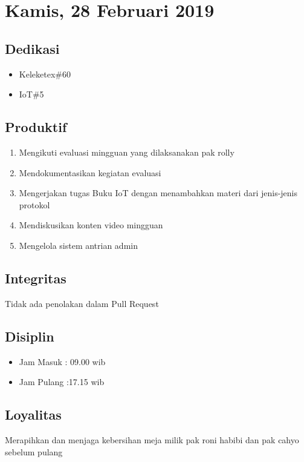 \section{Kamis, 28 Februari 2019}
\subsection{Dedikasi}
\begin{itemize}
\item Keleketex\#60
\item IoT\#5
\end{itemize}
\subsection{Produktif}
\begin{enumerate}
\item Mengikuti evaluasi mingguan yang dilaksanakan pak rolly
\item Mendokumentasikan kegiatan evaluasi
\item Mengerjakan tugas Buku IoT dengan menambahkan materi dari jenis-jenis protokol
\item Mendiskusikan konten video mingguan
\item Mengelola sistem antrian admin
\end{enumerate}
\subsection{Integritas}
Tidak ada penolakan dalam Pull Request
\subsection{Disiplin}
\begin{itemize}
\item Jam Masuk : 09.00 wib
\item Jam Pulang :17.15 wib
\end{itemize}
\subsection{Loyalitas}
Merapihkan dan menjaga kebersihan meja milik pak roni habibi dan pak cahyo sebelum pulang







